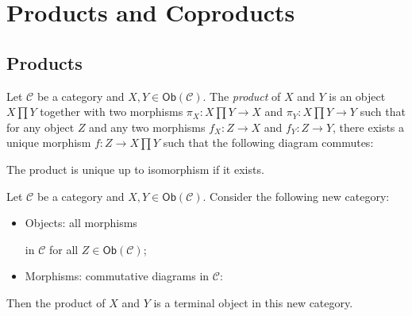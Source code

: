 \documentclass[
	11pt, %
	fleqn, %
	a4paper, %
]{LegrandOrangeBook}
\newcommand{\C}{\mathcal{C}} %
\newcommand{\Ob}[1]{\mathsf{Ob}(#1)} %
\begin{document}
\section{Products and Coproducts}

\subsection{Products}

\begin{definition}[Products]
    Let $\C$ be a category and $X, Y \in \Ob{\C}$. The \emph{product} of $X$ and $Y$ is an object $X \prod Y$ together with two morphisms $\pi_X : X \prod Y \to X$ and $\pi_Y : X \prod Y \to Y$ such that for any object $Z$ and any two morphisms $f_X : Z \to X$ and $f_Y : Z \to Y$, there exists a unique morphism $f : Z \to X \prod Y$ such that the following diagram commutes:
    \begin{center}
    \end{center}
\end{definition}
\begin{remark}
    The product is unique up to isomorphism if it exists.
\end{remark}

\begin{corollary}
    Let $\C$ be a category and $X, Y \in \Ob{\C}$. Consider the following new category:
    \begin{itemize}
        \item Objects: all morphisms  in $\C$ for all $Z \in \Ob{\C}$;
        \item Morphisms: commutative diagrams in $\C$:
    \end{itemize}
    \begin{center}
    \end{center}
    Then the product of $X$ and $Y$ is a terminal object in this new category.
\end{corollary}
\end{document}
